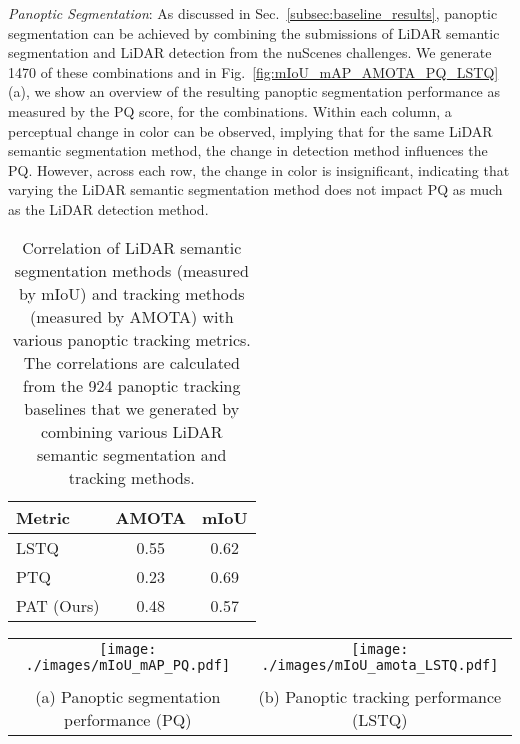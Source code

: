 \documentclass[letterpaper, 10 pt, journal, twoside]{IEEEtran}
\newcommand{\secref}[1]{Sec.~\ref{#1}}
\newcommand{\figref}[1]{Fig.~\ref{#1}}
\begin{document}
\noindent\textit{Panoptic Segmentation}: As discussed in \secref{subsec:baseline_results}, panoptic segmentation can be achieved by combining the submissions of LiDAR semantic segmentation and LiDAR detection from the nuScenes challenges. We generate 1470 of these combinations and in \figref{fig:mIoU_mAP_AMOTA_PQ_LSTQ}(a), we show an overview of the resulting panoptic segmentation performance as measured by the PQ score, for the combinations. Within each column, a perceptual change in color can be observed, implying that for the same LiDAR semantic segmentation method, the change in detection method influences the PQ. However, across each row, the change in color is insignificant, indicating that varying the LiDAR semantic segmentation method does not impact PQ as much as the LiDAR detection method.

\begin{table}
    \footnotesize
    \centering
    \caption{Correlation of LiDAR semantic segmentation methods (measured by mIoU) and tracking methods (measured by AMOTA) with various panoptic tracking metrics. The correlations are calculated from the 924 panoptic tracking baselines that we generated by combining various LiDAR semantic segmentation and tracking methods.}
    \begin{tabular}{l|c c}
    \toprule
         Metric         & AMOTA  & mIoU  \\
         \midrule
         LSTQ~\cite{aygun20214d}           & 0.55   & 0.62  \\
         PTQ~\cite{hurtado2020mopt}            & 0.23   & 0.69  \\
         PAT (Ours)           & 0.48   & 0.57  \\
         \bottomrule
    \end{tabular}
    \label{tab:correlations}
    \vspace{1cm}
\end{table}

\begin{figure*}
    \footnotesize
    \centering
    \begin{tabular}{c c}
    \texttt{[image: ./images/mIoU\_mAP\_PQ.pdf]} & \texttt{[image: ./images/mIoU\_amota\_LSTQ.pdf]} \\
    \\
    (a) Panoptic segmentation performance (PQ) & (b) Panoptic tracking performance (LSTQ) \\
    \end{tabular}
    \caption{Performance of panoptic segmentation and panotic tracking in relation to LiDAR semantic segmentation (mIoU) and detection (mAP) / tracking (AMOTA) performance respectively based on the combined baselines from LiDAR semantic segmentation and LiDAR detection / tracking methods.}
    \label{fig:mIoU_mAP_AMOTA_PQ_LSTQ}
\end{figure*}
\end{document}
